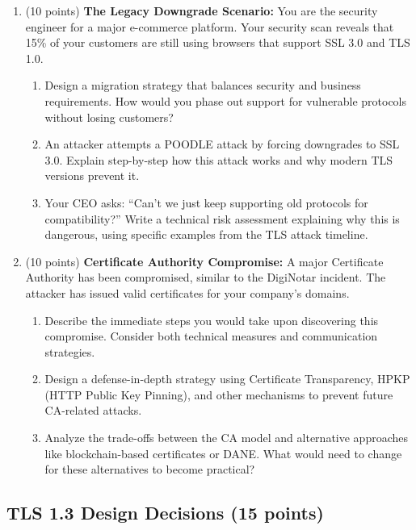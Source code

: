 \documentclass[10pt,a4paper,american]{article}
\begin{document}
\begin{enumerate}
	\item (10 points) \textbf{The Legacy Downgrade Scenario:}
	      You are the security engineer for a major e-commerce platform. Your security scan reveals that 15\% of your customers are still using browsers that support SSL 3.0 and TLS 1.0.
	      \begin{enumerate}
		      \item Design a migration strategy that balances security and business requirements. How would you phase out support for vulnerable protocols without losing customers?
		      \item An attacker attempts a POODLE attack by forcing downgrades to SSL 3.0. Explain step-by-step how this attack works and why modern TLS versions prevent it.
		      \item Your CEO asks: ``Can't we just keep supporting old protocols for compatibility?'' Write a technical risk assessment explaining why this is dangerous, using specific examples from the TLS attack timeline.
	      \end{enumerate}
	\item (10 points) \textbf{Certificate Authority Compromise:}
	      A major Certificate Authority has been compromised, similar to the DigiNotar incident. The attacker has issued valid certificates for your company's domains.
	      \begin{enumerate}
		      \item Describe the immediate steps you would take upon discovering this compromise. Consider both technical measures and communication strategies.
		      \item Design a defense-in-depth strategy using Certificate Transparency, HPKP (HTTP Public Key Pinning), and other mechanisms to prevent future CA-related attacks.
		      \item Analyze the trade-offs between the CA model and alternative approaches like blockchain-based certificates or DANE. What would need to change for these alternatives to become practical?
	      \end{enumerate}
\end{enumerate}

\subsection{TLS 1.3 Design Decisions (15 points)}
\end{document}
